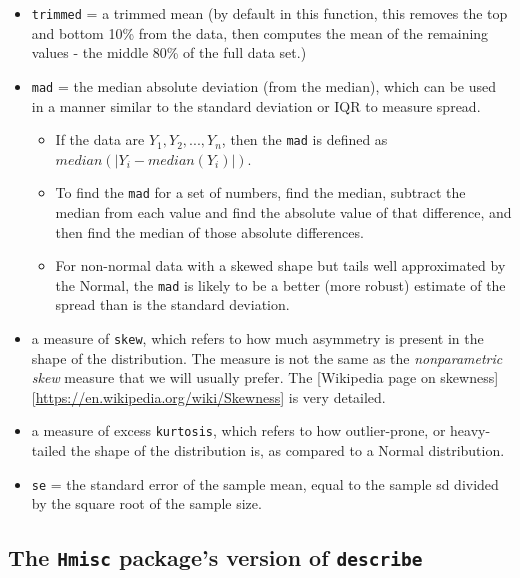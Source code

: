 \documentclass[
]{book}
\providecommand{\tightlist}{%
  \setlength{\itemsep}{0pt}\setlength{\parskip}{0pt}}
\begin{document}
\begin{itemize}
\tightlist
\item
  \texttt{trimmed} = a trimmed mean (by default in this function, this removes the top and bottom 10\% from the data, then computes the mean of the remaining values - the middle 80\% of the full data set.)
\item
  \texttt{mad} = the median absolute deviation (from the median), which can be used in a manner similar to the standard deviation or IQR to measure spread.

  \begin{itemize}
  \tightlist
  \item
    If the data are \(Y_1, Y_2, ..., Y_n\), then the \texttt{mad} is defined as \(median(|Y_i - median(Y_i)|)\).
  \item
    To find the \texttt{mad} for a set of numbers, find the median, subtract the median from each value and find the absolute value of that difference, and then find the median of those absolute differences.
  \item
    For non-normal data with a skewed shape but tails well approximated by the Normal, the \texttt{mad} is likely to be a better (more robust) estimate of the spread than is the standard deviation.
  \end{itemize}
\item
  a measure of \texttt{skew}, which refers to how much asymmetry is present in the shape of the distribution. The measure is not the same as the \emph{nonparametric skew} measure that we will usually prefer. The {[}Wikipedia page on skewness{]}{[}\url{https://en.wikipedia.org/wiki/Skewness}{]} is very detailed.
\item
  a measure of excess \texttt{kurtosis}, which refers to how outlier-prone, or heavy-tailed the shape of the distribution is, as compared to a Normal distribution.
\item
  \texttt{se} = the standard error of the sample mean, equal to the sample sd divided by the square root of the sample size.
\end{itemize}

\hypertarget{the-hmisc-packages-version-of-describe}{%
\subsection{\texorpdfstring{The \texttt{Hmisc} package's version of \texttt{describe}}{The Hmisc package's version of describe}}\label{the-hmisc-packages-version-of-describe}}
\end{document}
